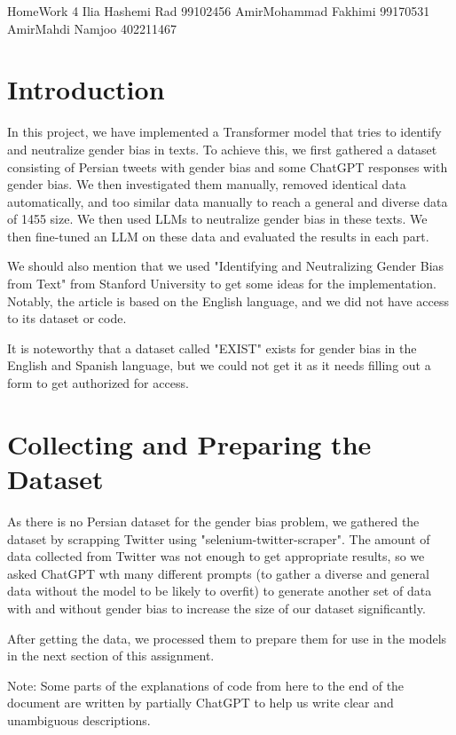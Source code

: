 \documentclass{solutionclass} %
\begin{document}
\pretitle
{HomeWork 4} %
{Ilia Hashemi Rad}
{99102456}
{AmirMohammad Fakhimi}
{99170531}
{AmirMahdi Namjoo}
{402211467}

\def\homeworkNumber{2}

\makeatletter
    \startcontents[sections]
\makeatother
    \def\Solu{Explanations}

\section{Introduction}

\begin{solution}
    In this project, we have implemented a Transformer model that tries to identify and neutralize gender bias in texts. To achieve this, we first gathered a dataset consisting of Persian tweets with gender bias and some ChatGPT responses with gender bias. We then investigated them manually, removed identical data automatically, and too similar data manually to reach a general and diverse data of 1455 size. We then used LLMs to neutralize gender bias in these texts. We then fine-tuned an LLM on these data and evaluated the results in each part.


We should also mention that we used "Identifying and Neutralizing Gender Bias from Text" from Stanford University to get some ideas for the implementation. Notably, the article is based on the English language, and we did not have access to its dataset or code.

It is noteworthy that a dataset called "EXIST" exists for gender bias in the English and Spanish language, but we could not get it as it needs filling out a form to get authorized for access.
\end{solution}


\section{Collecting and Preparing the Dataset}

\begin{solution}
As there is no Persian dataset for the gender bias problem, we gathered the dataset by scrapping Twitter using "selenium-twitter-scraper". The amount of data collected from Twitter was not enough to get appropriate results, so we asked ChatGPT wth many different prompts (to gather a diverse and general data without the model to be likely to overfit) to generate another set of data with and without gender bias to increase the size of our dataset significantly.

After getting the data, we processed them to prepare them for use in the models in the next section of this assignment.


Note: Some parts of the explanations of code from here to the end of the document are written by partially ChatGPT to help us write clear and unambiguous descriptions.

\end{solution}
\end{document}

